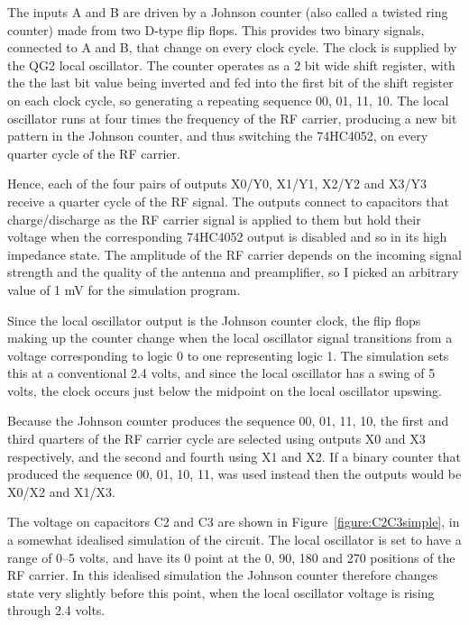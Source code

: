 \documentclass[11pt, twoside]{article}
\begin{document}
The inputs A and B are driven by a Johnson counter (also called a
twisted ring counter) made from two D-type flip flops.  This provides
two binary signals, connected to A and B, that change on every clock
cycle.  The clock is supplied by the QG2 local oscillator. The counter
operates as a 2 bit wide shift register, with the the last bit value
being inverted and fed into the first bit of the shift register on
each clock cycle, so generating a repeating sequence 00, 01, 11, 10.
The local oscillator runs at four times the frequency of the RF
carrier, producing a new bit pattern in the Johnson counter, and thus
switching the 74HC4052, on every quarter cycle of the RF carrier.

Hence, each of the four pairs of outputs X0/Y0, X1/Y1, X2/Y2 and X3/Y3
receive a quarter cycle of the RF signal.  The outputs connect to
capacitors that charge/discharge as the RF carrier signal is applied
to them but hold their voltage when the corresponding 74HC4052 output
is disabled and so in its high impedance state.  The amplitude of the
RF carrier depends on the incoming signal strength and the quality of
the antenna and preamplifier, so I picked an arbitrary value of 1 mV
for the simulation program.

Since the local oscillator output is the Johnson counter clock, the
flip flops making up the counter change when the local oscillator
signal transitions from a voltage corresponding to logic 0 to one
representing logic 1.  The simulation sets this at a conventional 2.4
volts, and since the local oscillator has a swing of 5 volts, the
clock occurs just below the midpoint on the local oscillator upswing.

Because the Johnson counter produces the sequence 00, 01, 11, 10, the
first and third quarters of the RF carrier cycle are selected using
outputs X0 and X3 respectively, and the second and fourth using X1 and
X2.  If a binary counter that produced the sequence 00, 01, 10, 11,
was used instead then the outputs would be X0/X2 and X1/X3.

The voltage on capacitors C2 and C3 are shown in
Figure~\ref{figure:C2C3simple}, in a somewhat idealised simulation of
the circuit.  The local oscillator is set to have a range of 0--5
volts, and have its 0{\degree} point at the 0{\degree}, 90{\degree},
180{\degree} and 270{\degree} positions of the RF carrier.  In this
idealised simulation the Johnson counter therefore changes state very
slightly before this point, when the local oscillator voltage is
rising through 2.4 volts.
\end{document}

